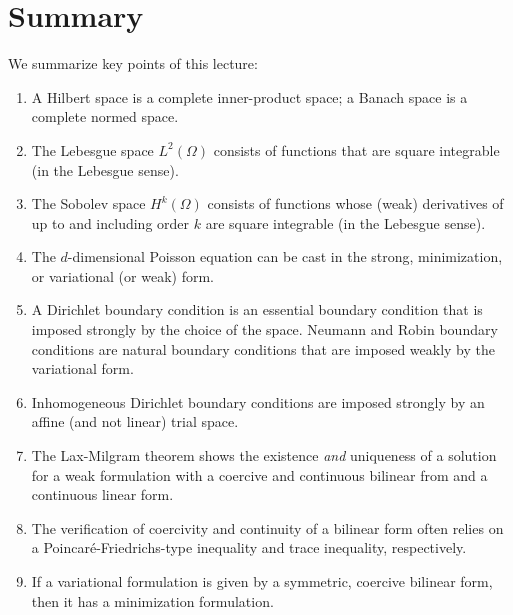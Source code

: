 
\section{Summary}
We summarize key points of this lecture:
\begin{enumerate}
\item A Hilbert space is a complete inner-product space; a Banach space is a complete normed space.
\item The Lebesgue space $L^2(\Omega)$ consists of functions that are square integrable (in the Lebesgue sense).
\item The Sobolev space $H^k(\Omega)$ consists of functions whose (weak) derivatives of up to and including order $k$ are square integrable (in the Lebesgue sense).
\item The $d$-dimensional Poisson equation can be cast in the strong, minimization, or variational (or weak) form.
\item A Dirichlet boundary condition is an essential boundary condition that is imposed strongly by the choice of the space.  Neumann and Robin boundary conditions are natural boundary conditions that are imposed weakly by the variational form.
\item Inhomogeneous Dirichlet boundary conditions are imposed strongly by an affine (and not linear) trial space.
\item The Lax-Milgram theorem shows the existence \emph{and} uniqueness of a solution for a weak formulation with a coercive and continuous bilinear from and a continuous linear form.
\item The verification of coercivity and continuity of a bilinear form often relies on a Poincar\'e-Friedrichs-type inequality and trace inequality, respectively.
\item If a variational formulation is given by a symmetric, coercive bilinear form, then it has a minimization formulation.
\end{enumerate}



